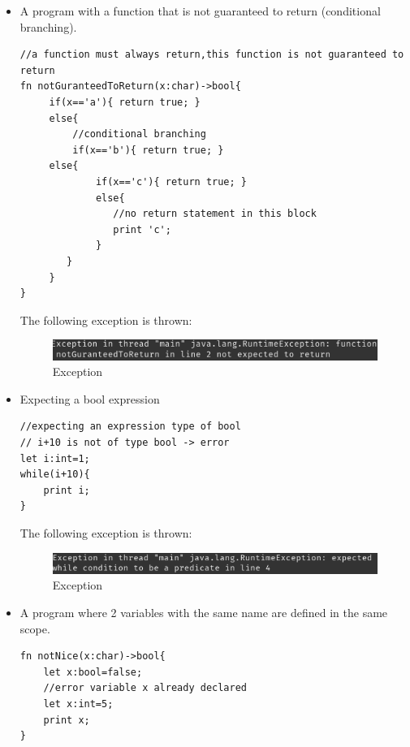 \begin{itemize}
    \item A program with a function that is not guaranteed to return (conditional branching).
\begin{lstlisting}[basicstyle=\tiny,caption=Program 4]
//a function must always return,this function is not guaranteed to return
fn notGuranteedToReturn(x:char)->bool{
     if(x=='a'){ return true; }
     else{ 
         //conditional branching 
         if(x=='b'){ return true; }
     else{
             if(x=='c'){ return true; }
             else{
        		//no return statement in this block
        		print 'c';
             }  
        }     
     }
}
\end{lstlisting}
    The following exception is thrown:
    \begin{figure}[H]
        \centering
        \includegraphics[scale=0.7]{Task345/images/funcNotExpectedToReturn.png}
        \caption{Exception}
        \label{fig:exception function not expected to return}
    \end{figure}
    
    
        
    
    \item Expecting a bool expression 
\begin{lstlisting}[basicstyle=\tiny,caption=Program 5]
//expecting an expression type of bool
// i+10 is not of type bool -> error
let i:int=1;
while(i+10){
	print i;
}
\end{lstlisting}

    The following exception is thrown:
    \begin{figure}[H]
        \centering
        \includegraphics[scale=0.7]{Task345/images/typeCheckingError.png}
        \caption{Exception}
        \label{fig:exception function not expected to return}
    \end{figure}
    
    \item A program where 2 variables with the same name are defined in the same scope.
    
\begin{lstlisting}[basicstyle=\tiny,caption=Program 6]
fn notNice(x:char)->bool{
	let x:bool=false;
	//error variable x already declared
	let x:int=5;
	print x;
}


\end{lstlisting}
\end{itemize}
